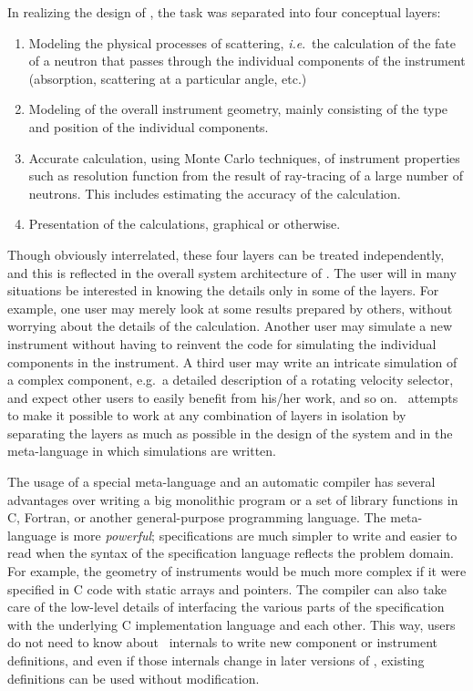 In realizing the design of \MCX, the task was
separated into four conceptual layers:
\begin{enumerate}
\item Modeling the physical processes of scattering, \textit{i.e}.\
  the calculation of the fate of a neutron that passes through the
  individual components of the instrument (absorption, scattering at a
  particular angle, etc.)
\item Modeling of the overall instrument geometry, mainly consisting
  of the type and position of the individual components.
\item Accurate calculation, using Monte Carlo techniques, of
  instrument properties such as resolution function from the result of
  ray-tracing of a large number of neutrons. This includes estimating
  the accuracy of the calculation.
\item Presentation of the calculations, graphical or otherwise.
\end{enumerate}

Though obviously interrelated, these four layers can be
treated independently, and this is reflected in the overall system
architecture of \MCX. The user will in many situations be
interested in knowing the details only in some of the layers. For
example, one user may merely look at some results prepared by others,
without worrying about the details of the calculation. Another user
may simulate a new instrument without having to reinvent the
code for simulating the individual components in the instrument. A third
user may write an intricate simulation of a complex component,
e.g.\ a detailed description of a rotating velocity selector,
and expect other users to easily
benefit from his/her work, and so on. \MCX\ attempts to make it
possible to work at any combination of layers in isolation by separating
the layers as much as possible in the design of the system and in
the meta-language in which simulations are written.

The usage of a special meta-language and an automatic compiler has
several advantages over writing a big monolithic program or a set of
library functions in C, Fortran, or another general-purpose programming
language.  The meta-language is more \textit{powerful}; specifications
are much simpler to write and easier to read when the syntax of the
specification language reflects the problem domain. For example, the
geometry of instruments would be much more complex if it were specified
in C code with static arrays and pointers. The compiler can also take
care of the low-level details of interfacing the various parts of the
specification with the underlying C implementation language and each
other. This way, users do not need to know about \MCX\ internals to
write new component or instrument definitions, and even if those
internals change in later versions of \MCX, existing definitions can be
used without modification.

